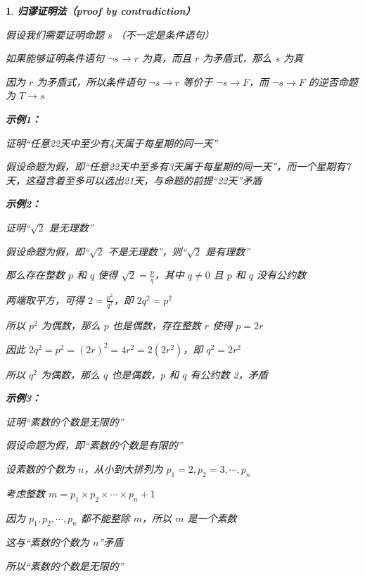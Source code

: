 \documentclass[UTF8]{report}
\theoremstyle{MyLineTheoremStyle} %
\theoremstyle{MyBlockTheoremStyle} %
\theoremstyle{MySubsubsectionStyle} %
\newtheorem{definition}{}
\begin{document}
\begin{definition}
    \textbf{归谬证明法（proof by contradiction）}\par
    假设我们需要证明命题 $s$ （不一定是条件语句）\par
    如果能够证明条件语句 $\neg s \rightarrow r$ 为真，而且 $r$ 为矛盾式，那么 $s$ 为真\par
    因为 $r$ 为矛盾式，所以条件语句 $\neg s \rightarrow r$ 等价于 $\neg s \rightarrow F$，而 $\neg s \rightarrow F$ 的逆否命题为 $T \rightarrow s$\par
\vspace{1em}
    \textbf{示例1：}\par
    证明“任意22天中至少有4天属于每星期的同一天”\par
    假设命题为假，即“任意22天中至多有3天属于每星期的同一天”，而一个星期有7天，这蕴含着至多可以选出21天，与命题的前提“22天”矛盾\par
\vspace{1em}
    \textbf{示例2：}\par
    证明“$\sqrt{2}$ 是无理数”\par
    假设命题为假，即“$\sqrt{2}$ 不是无理数”，则“$\sqrt{2}$ 是有理数”\par
    那么存在整数 $p$ 和 $q$ 使得 $\sqrt{2} = \frac{p}{q}$，其中 $q \neq 0$ 且 $p$ 和 $q$ 没有公约数\par
    两端取平方，可得 $2 = \frac{p^2}{q^2}$，即 $2q^2 = p^2$\par
    所以 $p^2$ 为偶数，那么 $p$ 也是偶数，存在整数 $r$ 使得 $p = 2r$\par
    因此 $2q^2 = p^2 = (2r)^2 = 4r^2 = 2(2r^2)$，即 $q^2 = 2r^2$\par
    所以 $q^2$ 为偶数，那么 $q$ 也是偶数，$p$ 和 $q$ 有公约数 2，矛盾\par
\vspace{1em}
    \textbf{示例3：}\par
    证明“素数的个数是无限的”\par
    假设命题为假，即“素数的个数是有限的”\par
    设素数的个数为 $n$，从小到大排列为 $p_1 = 2, p_2 = 3, \cdots, p_n$\par
    考虑整数 $m = p_1 \times p_2 \times \cdots \times p_n + 1$\par
    因为 $p_1, p_2, \cdots, p_n$ 都不能整除 $m$，所以 $m$ 是一个素数\par
    这与“素数的个数为 $n$”矛盾\par
    所以“素数的个数是无限的”\par
\vspace{1em}

\end{definition}
\end{document}
